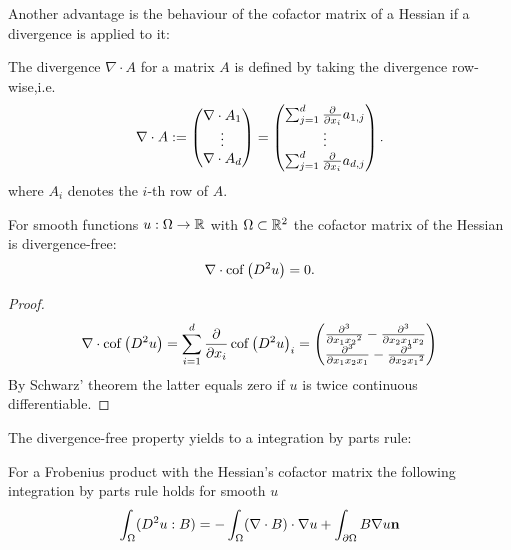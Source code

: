 \begin{definition} 
Another advantage is the behaviour of the cofactor matrix of a Hessian if a divergence is applied to it:
\begin{definition}
The divergence $\nabla \cdot A$ for a matrix $A$ is defined by taking the divergence row-wise,i.e.
\[
	\nabla \cdot A := \begin{pmatrix} \nabla \cdot A_1 \\ \vdots \\ \nabla \cdot A_d\end{pmatrix}
	= \begin{pmatrix} \sum_{j = 1}^{d} \frac \partial {\partial x_i} a_{1,j} \\ \vdots \\ \sum_{j = 1}^{d} \frac \partial {\partial x_i} a_{d,j}\end{pmatrix}.
\]
where $A_i$ denotes the $i$-th row of $A$.
	
\end{definition}

\begin{lemma} \label{la: divergence free cof}
For smooth functions $u:\Omega \rightarrow \mathbb{R}$ with $\Omega \subset \mathbb{R}^2$ the cofactor matrix of the Hessian is divergence-free:
\[
	\nabla \cdot \operatorname{cof} \left( D^2 u \right) = 0.
\] 
\end{lemma}
\begin{proof}
\begin{align*}
	\nabla \cdot \operatorname{cof} \left( D^2 u \right) = \sum_{i=1}^{d} \frac \partial {\partial  x_i}\operatorname{cof} \left( D^2 u \right)_i = 
	\begin{pmatrix}
		\frac {\partial^3} {\partial x_1 {x_2}^2 } -\frac {\partial^3} {\partial{x_2} x_1 {x_2}} \\
				\frac {\partial^3} {\partial {x_1}x_2 {x_1}} -\frac {\partial^3} {\partial x_2 {x_1}^2 }
	\end{pmatrix}
\end{align*}
By Schwarz' theorem the latter equals zero if $u$ is twice continuous differentiable.
\end{proof}

The divergence-free property yields to a integration by parts rule:
\begin{lemma} \label{la: integration by parts Frobenius}
For a Frobenius product with the Hessian's cofactor matrix  the following integration by parts rule holds for smooth $u$
\[
	\int_\Omega (D^2 u : B) = - \int_\Omega (\nabla \cdot B) \cdot \nabla u + \int_{\partial \Omega}  B \nabla u \bf n
\] 
\end{lemma}


\end{definition}
